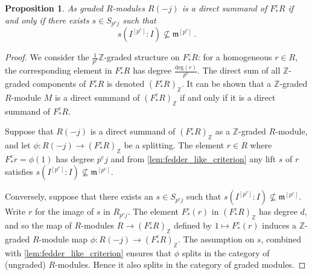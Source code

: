 \documentclass{amsart}
\newcommand{\fm}{\mathfrak{m}}
\newtheorem{proposition}[subsection]{Proposition}
\theoremstyle{definition}
\theoremstyle{remark}
\numberwithin{equation}{subsection}
\begin{document}
\begin{proposition}
\label{prop:general_graded_fedder} 
As graded $R$-modules $R(-j)$ is a direct summand of $F_*^e R$ if and only if there exists $s \in S_{p^ej}$ such that
\[
 s (I^{[p^e]} : I) \not\subseteq \fm^{[p^e]}\,.
\]
\end{proposition}
	
\begin{proof}
We consider the $\frac{1}{p^e}\mathbb{Z}$-graded structure on $F^e_*R$: for a homogeneous $r \in R$, the corresponding element in $F^e_*R$ has degree $\frac{\text{deg}(r)}{p^e}$. The direct sum of all $\mathbb{Z}$-graded components of $F_*^e R$ is denoted $(F_\ast^e R)_\mathbb{Z}$. It can be shown that a $\mathbb{Z}$-graded $R$-module $M$ is a direct summand of $(F_\ast^e R)_\mathbb{Z}$ if and only if it is a direct summand of $F_\ast^e R$.
 
Suppose that $R(-j)$ is a direct summand of $(F_*^e R)_\mathbb{Z}$ as a $\mathbb{Z}$-graded $R$-module, and let $\phi\colon R(-j) \to (F_*^e
R)_\mathbb{Z}$ be a splitting. The element $r \in R$ where $F^e_* r = \phi(1)$  has degree $p^ej$ and from \cref{lem:fedder_like_criterion} any lift $s$ of $r$ satisfies $s (I^{[p^e]} : I) \not\subseteq \fm^{[p^e]}$.
	
Conversely, suppose that there exists an $s \in S_{p^ej}$ such that
$s (I^{[p^e]} : I) \not\subseteq \fm^{[p^e]}.$
Write $r$ for the image of $s$ in $R_{p^ej}$. The element $F_*^e (r)$ in $(F_*^e R)_\mathbb{Z}$ has degree $d$, and so the map of $R$-modules $R \to (F_*^e R)_\mathbb{Z}$ defined by $1 \mapsto F_*^e (r)$ induces a $\mathbb{Z}$-graded $R$-module map
$\phi\colon R(-j) \to (F_*^e R)_\mathbb{Z}$. The assumption on $s$, combined with \cref{lem:fedder_like_criterion} ensures that $\phi$ splits in the category of (ungraded) $R$-modules. Hence it also splits in the category of graded modules. 
\end{proof}
\end{document}
